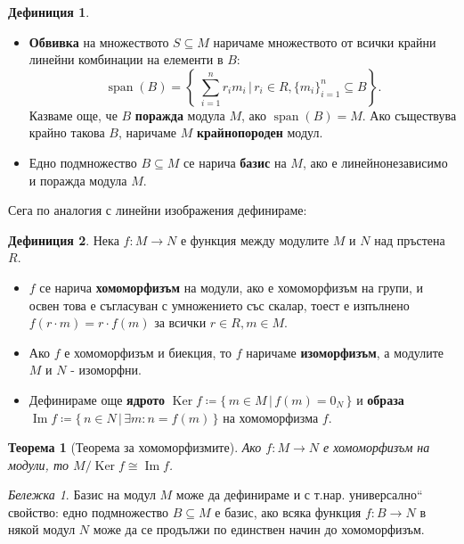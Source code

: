 \documentclass{article}
\newif\ifusemulticols
\newcommand\newterm[1]{\textbf{#1}}
\theoremstyle{definition}
\newtheorem{deff}{Дефиниция}
\theoremstyle{remark}
\newtheorem*{note}{Бележка}
\theoremstyle{plain}
\newtheorem{theorem}{Теорема}
\theoremstyle{plain}
\newenvironment{mymulticols}
    { \ifusemulticols \begin{multicols}{2} \fi }
    { \ifusemulticols \end{multicols} \fi }
\DeclareMathOperator{\vecspan}{span}
\DeclareMathOperator{\Ker}{Ker}
\DeclareMathOperator{\image}{Im}
\begin{document}
\begin{mymulticols}
\begin{deff}
\begin{itemize}
        \item \newterm{Обвивка} на множеството $S \subseteq M$ наричаме множеството от всички крайни линейни комбинации на елементи в $B$: 
          $$\vecspan(B)=\left\{\; \sum_{i=1}^n r_i m_i \,\Big|\, r_i \in R, \{m_i\}_{i=1}^n \subseteq B \right\}.$$
            Казваме още, че $B$ \newterm{поражда} модула $M$, ако $\vecspan(B) = M$.
            Ако съществува крайно такова $B$, наричаме $M$ \newterm{крайнопороден} модул.
        \item Едно подмножество $B \subseteq M$ се нарича \newterm{базис} на $M$, ако е линейнонезависимо и поражда модула $M$.
    \end{itemize}
\end{deff}

Сега по аналогия с линейни изображения дефинираме:

\begin{deff}
    Нека $f: M \to N$ е функция между модулите $M$ и $N$ над пръстена $R$.
    \begin{itemize}
        \item $f$ се нарича \newterm{хомоморфизъм} на модули, ако е хомоморфизъм на групи, и освен
            това е съгласуван с умножението със скалар, тоест е изпълнено $f(r\cdot m) = r \cdot
            f(m)$ за всички $r \in R, m \in M$.
        \item Ако $f$ е хомоморфизъм и биекция, то $f$ наричаме \newterm{изоморфизъм}, а модулите
            $M$ и $N$ - изоморфни.

        \item Дефинираме още \newterm{ядрото} $\Ker f \coloneqq \{ \, m \in M \,|\, f(m) = 0_N \,
            \}$ и \newterm{образа} $\image f \coloneqq \{ \, n \in N \,|\, \exists m: n = f(m) \,
            \}$ на хомоморфизма $f$.
    \end{itemize}
\end{deff}

\begin{theorem}[Теорема за хомоморфизмите]
    Ако ${f : M \to N}$ е хомоморфизъм на модули, то $M / \Ker f \cong \image f$.
\end{theorem}

\begin{note}
    Базис на модул $M$ може да дефинираме и с т.нар. \quotedblbase универсално`` свойство: едно подмножество $B \subseteq M$ е базис, ако всяка функция $f: B \to N$ в някой модул $N$ може да се продължи по единствен начин до хомоморфизъм.
\end{note}


\end{mymulticols}
\end{document}
